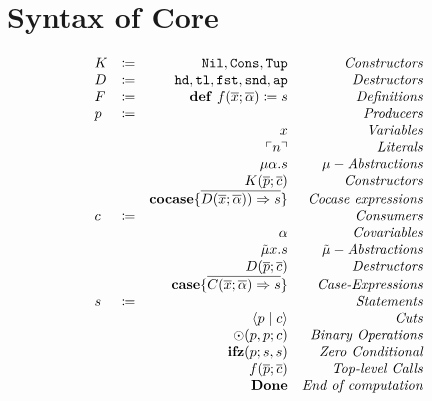\documentclass[nonacm]{acmart}
\newcommand{\lit}[1]{\ensuremath{\ulcorner #1\urcorner}}
\newcommand{\cut}[2]{\ensuremath{\langle #1 \mid #2 \rangle}}
\begin{document}
\section{Syntax of Core}
\[
\begin{array}{l c r r}
  K & \coloneqq & \mathtt{Nil}, \mathtt{Cons}, \mathtt{Tup} & \emph{Constructors}\\
  D & \coloneqq & \mathtt{hd}, \mathtt{tl}, \mathtt{fst}, \mathtt{snd}, \mathtt{ap} & \emph{Destructors}\\
  F & \coloneqq & \mathbf{def}\ f(\overline{x};\overline{\alpha}) \coloneq s & \emph{Definitions}\\
  p & \coloneqq & & \emph{Producers}\\
  && x & \emph{Variables}\\
  && \lit{n} & \emph{Literals}\\
  && \mu \alpha.s & \mu-\emph{Abstractions}\\
  && K(\overline{p};\overline{c}) & \emph{Constructors}\\
  && \mathbf{cocase} \{ \overline{D(\overline{x};\overline{\alpha})) \Rightarrow s}\} & \emph{Cocase expressions}\\
  c & \coloneqq && \emph{Consumers}\\
  && \alpha & \emph{Covariables}\\
  && \tilde{\mu} x.s & \tilde{\mu}-\emph{Abstractions}\\
  && D(\overline{p};\overline{c}) & \emph{Destructors}\\
  && \mathbf{case} \{ \overline{C(\overline{x};\overline{\alpha}) \Rightarrow s} \} & \emph{Case-Expressions}\\
  s & \coloneqq && \emph{Statements}\\
  && \cut{p}{c} & \emph{Cuts}\\
  && \odot(p,p;c) & \emph{Binary Operations}\\
  && \mathbf{ifz}(p;s,s) & \emph{Zero Conditional}\\
  && f(\overline{p};\overline{c}) & \emph{Top-level Calls} \\
  && \mathbf{Done} & \emph{End of computation}
\end{array}
\]
\end{document}
